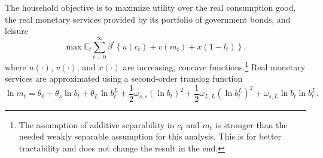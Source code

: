 \documentclass[11pt,a4paper,margin=1.5in]{article}
\begin{document}
The household objective is to maximize utility over the real consumption good, the real monetary services provided by its portfolio of government bonds, and leisure
\begin{equation}
	\max\mathbb{E}_t\! \sum^\infty_{t=0} \beta^t\left\{u(c_t) + v\left(m_t\right) + x(1-l_t)\right\},
	\label{eq:HH_Utility}
\end{equation}
where $u(\cdot)$, $v(\cdot)$, and $x(\cdot)$ are increasing, concave functions.\footnote{
	The assumption of additive separability in $c_t$ and $m_t$ is stronger than the needed weakly separable assumption for this analysis.
	This is for better tractability and does not change the result in the end.}
Real monetary services are approximated using a second-order translog function
\begin{equation}
	\ln m_t = \theta_0 + \theta_s \ln b_t + \theta_L \ln b^L_t + \frac{1}{2}\omega_{s,s} \left(\ln b_t\right)^2 + \frac{1}{2}\omega_{L,L} \left(\ln b^L_t\right)^2 + \omega_{s,L}\ln b_t \ln b^L_t.
	\label{eq:HH_MonServices}
\end{equation}
\end{document}
